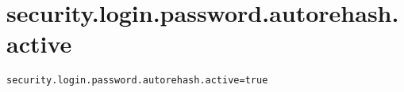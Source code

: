\section{security.login.password.autorehash.active}
\label{configuration:SecurityLoginPasswordAutorehashActive}
\ClearAPI
\TODO
{}
\begin{lstlisting}[style=Props,caption={Usage example for \textit{security.login.password.autorehash.active}}]
security.login.password.autorehash.active=true
\end{lstlisting}